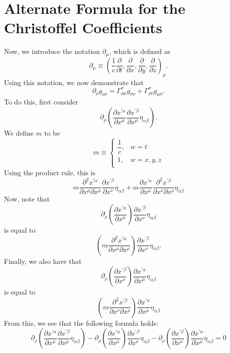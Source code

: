 \documentclass[12pt]{article}
\theoremstyle{definition}
\theoremstyle{remark}
\begin{document}
\section{Alternate Formula for the Christoffel Coefficients}
	Now, we introduce the notation $\partial_{\mu}$, which is defined as 
	\[
	\partial_{\mu} \equiv \left( \frac{1}{c} \frac{ \partial }{  \partial t } , \frac{ \partial }{ \partial x} , \frac{ \partial }{ \partial y }, \frac{ \partial }{ \partial z } \right)_{\mu} .
	\]
	Using this notation, we now demonstrate that 
	\[
	\partial_{\rho} g_{\rho \nu} = \Gamma^{ \sigma }_{ \rho \mu } g_{ \sigma \nu } + \Gamma^{ \sigma }_{ \rho \nu } g_{ \mu \sigma } .
	\]
	To do this, first consider 
	\[
	\partial_{\rho} 
	\left( \frac{ \partial x^{ \prime \alpha } }{ \partial x^{ \mu } } 
	\frac{ \partial x^{ \prime \beta } }{ \partial x^{ \mu } } 
	\eta_{ \alpha \beta } \right).
	\]
	We define $m$ to be 
	\[
	m \equiv 
	\begin{cases} 
	\dfrac{1}{c} ,& w = t \\
	1 ,& w = x,y,z \\
	\end{cases}
	\]
	Using the product rule, this is
	\[
	m \frac{ \partial^2 x^{ \prime \alpha } }{ \partial x^{ \mu } \partial x^{ \rho } } 
	\frac{ \partial x^{ \prime \beta } }{ \partial x^{ \nu } }
	\eta_{ \alpha \beta }
	+
	m \frac{ \partial x^{ \prime \alpha } }{ \partial x^{ \mu } } 
	\frac{ \partial^2 x^{ \prime \beta } }{ \partial x^{ \nu } \partial x^{ \rho } } \eta_{ \alpha \beta }
	\]
	Now, note that
	\[
	\partial_{ \rho } \left( \frac{ \partial x^{ \prime \alpha } }{ \partial x^{ \mu } } \right)
	\frac{ \partial x^{ \prime \beta } }{ \partial x^{ \nu } } \eta_{\alpha \beta } 
	\]
	is equal to
	\[
	\left( m \frac{ \partial^2 x^{ \prime \alpha } }{ \partial x^{ \mu } \partial x^{ \rho } } \right) \frac{ \partial x^{ \prime \beta } }{ \partial x^{ \nu } } \eta_{ \alpha \beta }.
	\]
	Finally, we also have that
	\[
	\partial_{ \rho } 
	\left( \frac{ \partial x^{ \prime \beta } }{ \partial x^{ \nu } }  \right)
	\frac{ \partial x^{ \prime \alpha } }{ \partial x^{ \mu } } \eta_{ \alpha \beta} 
	\]
	is equal to 
	\[
	\left( m \frac{ \partial^2 x^{ \prime \beta } }{ \partial x^{ \nu } \partial x^{ \rho } } \right) \frac{ \partial x^{ \prime \alpha } }{ \partial x^{ \mu } } \eta_{ \alpha \beta}
	\]
	From this, we see that the following formula holds:
	\[
	\partial_{\rho} 
	\left( \frac{ \partial x^{ \prime \alpha } }{ \partial x^{ \mu } } 
	\frac{ \partial x^{ \prime \beta } }{ \partial x^{ \mu } } 
	\eta_{ \alpha \beta } \right)
	-
	\partial_{ \rho }
	\left( \frac{ \partial x^{ \prime \alpha } }{ \partial x^{ \mu } } \right) 
	\frac{ \partial x^{ \prime \beta } }{ \partial x^{ \nu } } 
	\eta_{ \alpha \beta }
	-
	\partial_{ \rho } 
	\left( \frac{ \partial x^{ \prime \beta } }{ \partial x^{ \nu } } \right) 
	\frac{ \partial x^{ \prime \alpha } }{ \partial x^{ \mu } } \eta_{\alpha \beta } 
	=
	0
	\]
\end{document}
